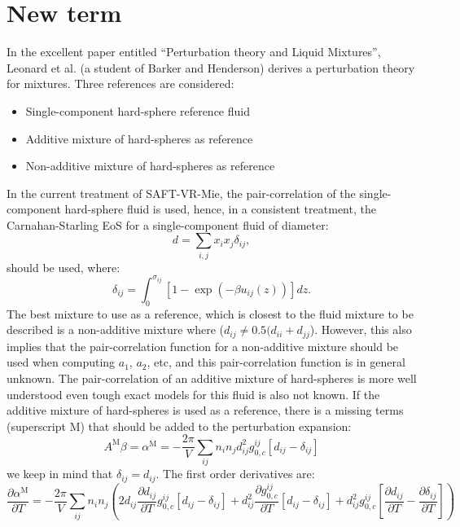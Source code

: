 \documentclass[english]{../thermomemo/thermomemo}
\begin{document}
\section{New term}
In the excellent paper entitled ``Perturbation theory and Liquid Mixtures'', Leonard et al. (a student of Barker and Henderson) derives a perturbation theory for mixtures. Three references are considered:
\begin{itemize}
\item Single-component hard-sphere reference fluid
\item Additive mixture of hard-spheres as reference
\item Non-additive mixture of hard-spheres as reference
\end{itemize}
In the current treatment of SAFT-VR-Mie, the pair-correlation of the single-component hard-sphere fluid is used, hence, in a consistent treatment, the Carnahan-Starling EoS for a single-component fluid of diameter:
\begin{equation}
d=\sum_{i,j}x_ix_j\delta_{ij},
\end{equation}
should be used, where:
\begin{equation}
\delta_{ij}=\int_0^{\sigma_{ij}}\left[1-\exp{(-\beta u_{ij}(z))}\right]dz.
\end{equation}
The best mixture to use as a reference, which is closest to the fluid mixture to be described is a non-additive mixture where ($d_{ij}\neq 0.5(d_{ii}+d_{jj}$). However, this also implies that the pair-correlation function for a non-additive mixture should be used when computing $a_1$, $a_2$, etc, and this pair-correlation function is in general unknown. The pair-correlation of an additive mixture of hard-spheres is more well understood even tough exact models for this fluid is also not known. If the additive mixture of hard-spheres is used as a reference, there is a missing terms (superscript M) that should be added to the perturbation expansion:
\begin{equation}
A^{\text{M}}\beta=\alpha^\text{M}=-\frac{2\pi}{V}\sum_{ij}n_in_jd_{ij}^2g_{0,c}^{ij}\left[d_{ij}-\delta_{ij}\right]
\end{equation}
we keep in mind that $\delta_{ij}=d_{ij}$. The first order derivatives are:
\begin{equation}
\frac{\partial \alpha^{\text{M}}}{\partial T}=-\frac{2\pi}{V}\sum_{ij}n_in_j\left(2d_{ij}\frac{\partial d_{ij}}{\partial T}g_{0,c}^{ij}\left[d_{ij}-\delta_{ij}\right]+d_{ij}^2\frac{\partial g_{0,c}^{ij}}{\partial T}\left[d_{ij}-\delta_{ij}\right]+d_{ij}^2g_{0,c}^{ij}\left[\frac{\partial d_{ij}}{\partial T}-\frac{\partial \delta_{ij}}{\partial T}\right]\right)
\end{equation}
\end{document}
